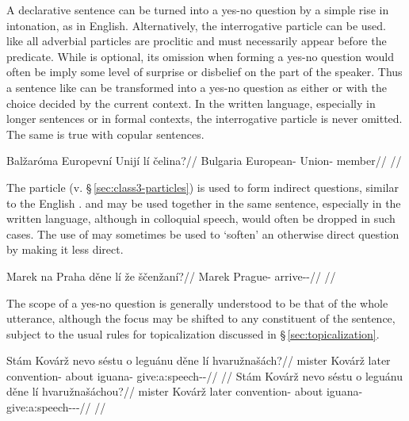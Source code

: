 A declarative sentence can be turned into a yes-no question by a simple rise in
intonation, as in English. Alternatively, the interrogative particle 
can be used.  like all adverbial particles are proclitic and must
necessarily appear before the predicate. While  is optional, its
omission when forming a yes-no question would often be imply some level of
surprise or disbelief on the part of the speaker. Thus a sentence like
 can be transformed into a yes-no
question as either  or  with the choice decided by the current
context. In the written language, especially in longer sentences or in formal
contexts, the interrogative particle is never omitted. The same is true with
copular sentences.

\pex
\begingl
  \gla Balžaróma Europevní Unijí lí čelina?//
  \glb Bulgaria European-\Att{} Union-\Gen{} \Q{} member//
  \glft {}//
\endgl
\xe

The particle  (v. \S\,\ref{sec:class3-particles}) is used to form
indirect questions, similar to the English .  and
 may be used together in the same sentence, especially in the written
language, although in colloquial speech,  would often be dropped in such
cases. The use of  may sometimes be used to `soften' an otherwise
direct question by making it less direct.

\pex
\begingl
  \gla Marek na Praha děne lí že ščenžaní?//
  \glb Marek \Loc{} Prague-\Acc{} \Spec{} \Q{} \Pfv{} arrive-\Av{}-\Ret{}//
  \glft {}//
\endgl
\xe

The scope of a yes-no question is generally understood to be that of the whole
utterance, although the focus may be shifted to any constituent of the sentence,
subject to the usual rules for topicalization discussed in
\S\,\ref{sec:topicalization}.

\pex
\a\begingl
  \gla Stám Kovárž nevo séstu o leguánu děne lí hvaružnašách?//
  \glb mister Kovárž later convention-\Ins{} about iguana-\Ins{} \Spec{} \Q{} give:a:speech-\Av{}-\Ctp{}//
  \glft {}//
  \endgl
\a\begingl
  \gla Stám Kovárž nevo séstu o leguánu děne lí hvaružnašáchou?//
  \glb mister Kovárž later convention-\Ins{} about iguana-\Ins{} \Spec{} \Q{} give:a:speech-\Av{}-\Ctp{}-\Nz{}//
  \glft {}//
  \endgl
\xe

